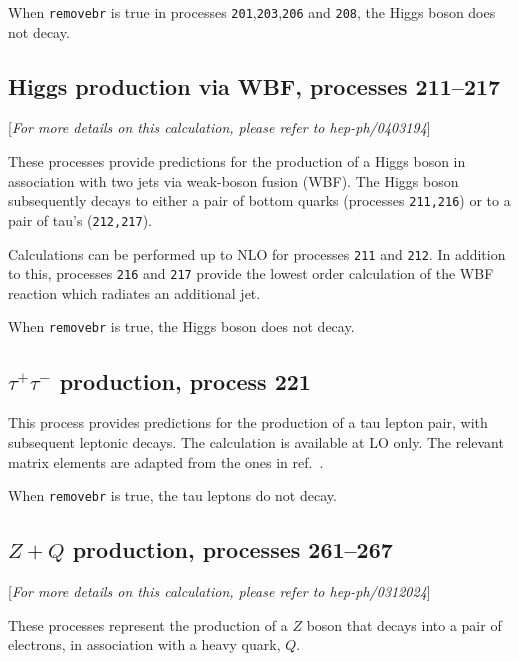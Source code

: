 \documentclass[12pt]{article}
\begin{document}
When {\tt removebr} is true in processes {\tt 201},{\tt 203},{\tt 206}
and {\tt 208}, the Higgs boson does not decay.

\subsection{Higgs production via WBF, processes 211--217}
\label{subsec:wbf}

\begin{center}
[{\it For more details on this calculation, please refer to hep-ph/0403194}]
\end{center}

These processes provide predictions for the production of a Higgs boson in
association with two jets via weak-boson fusion (WBF). The Higgs boson
subsequently decays to either a pair of bottom quarks
(processes {\tt 211,216}) or to a pair of tau's ({\tt 212,217}).

Calculations can be performed up to NLO for processes {\tt 211} and {\tt 212}.
In addition to this, processes {\tt 216} and {\tt 217} provide the lowest
order calculation of the WBF reaction which radiates an additional jet. 

When {\tt removebr} is true, the Higgs boson does not decay.

\subsection{$\tau^+\tau^-$ production, process 221}
\label{subsec:tautau}

This process provides predictions for the production of a tau lepton
pair, with subsequent leptonic decays. The calculation is available at LO
only. The relevant matrix elements are adapted from the ones in
ref.~\cite{Kleiss:1988xr}.

When {\tt removebr} is true, the tau leptons do not decay.

\subsection{$Z+Q$ production, processes 261--267}
\label{subsec:ZQ}

\begin{center}
[{\it For more details on this calculation, please refer to hep-ph/0312024}]
\end{center}

These processes represent the production of a $Z$
boson that decays into a pair of electrons,
in association with a heavy quark, $Q$.
\end{document}
